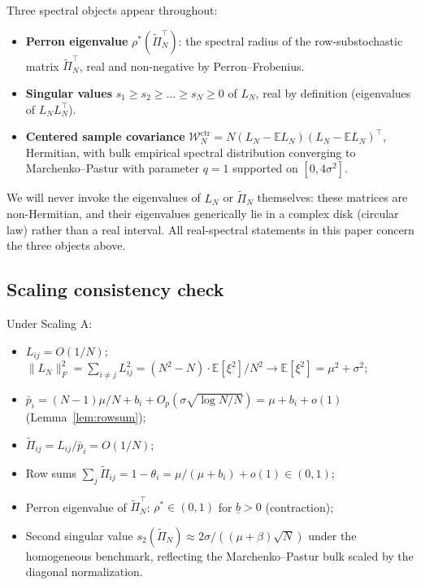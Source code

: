 \documentclass[11pt,a4paper]{article}
\theoremstyle{definition}
\newcommand{\WN}{\mathcal{W}_N^{\mathrm{ctr}}}
\newcommand{\rhoStar}{\rho^\ast}
\begin{document}
Three spectral objects appear throughout:

\begin{itemize}
\item \textbf{Perron eigenvalue} $\rhoStar(\widetilde\Pi_N^\top)$: the spectral
  radius of the row-substochastic matrix $\widetilde\Pi_N^\top$, real and
  non-negative by Perron--Frobenius.
\item \textbf{Singular values} $s_1\geq s_2\geq\dots\geq s_N\geq 0$ of $L_N$,
  real by definition (eigenvalues of $L_N L_N^\top$).
\item \textbf{Centered sample covariance} $\WN = N(L_N - \mathbb E L_N)
  (L_N - \mathbb E L_N)^\top$, Hermitian, with bulk empirical spectral
  distribution converging to Marchenko--Pastur with parameter $q=1$ supported
  on $[0,4\sigma^2]$.
\end{itemize}

We will never invoke the eigenvalues of $L_N$ or $\widetilde\Pi_N$ themselves:
these matrices are non-Hermitian, and their eigenvalues generically lie in a
complex disk (circular law) rather than a real interval. All real-spectral
statements in this paper concern the three objects above.

\subsection{Scaling consistency check}

Under Scaling A:
\begin{itemize}[leftmargin=1.5em]
\item $L_{ij} = O(1/N)$; $\|L_N\|_F^2 = \sum_{i\neq j}L_{ij}^2
      = (N^2-N)\cdot\mathbb E[\xi^2]/N^2 \to \mathbb E[\xi^2] = \mu^2+\sigma^2$;
\item $\bar p_i = (N-1)\mu/N + b_i + O_p(\sigma\sqrt{\log N/N}) = \mu+b_i+o(1)$
      (Lemma~\ref{lem:rowsum});
\item $\widetilde\Pi_{ij} = L_{ij}/\bar p_i = O(1/N)$;
\item Row sums $\sum_j\widetilde\Pi_{ij} = 1 - \theta_i = \mu/(\mu+b_i)+o(1)\in(0,1)$;
\item Perron eigenvalue of $\widetilde\Pi_N^\top$: $\rhoStar\in(0,1)$ for
      $\underline b>0$ (contraction);
\item Second singular value $s_2(\widetilde\Pi_N)\approx 2\sigma/((\mu+\beta)\sqrt N)$
      under the homogeneous benchmark, reflecting the Marchenko--Pastur bulk
      scaled by the diagonal normalization.
\end{itemize}
\end{document}
